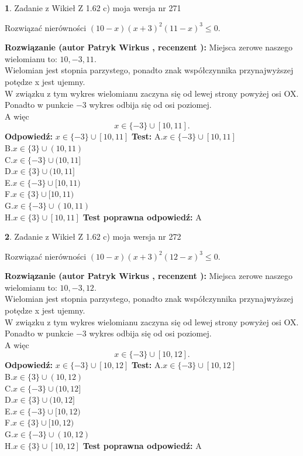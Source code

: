 \documentclass[12pt, a4paper]{article}
\theoremstyle{definition} %
\newtheorem{zad}{}
\newcommand{\zadStart}[1]{\begin{zad}#1\newline}
\newcommand{\zadStop}{\end{zad}}
\newcommand{\rozwStart}[2]{\noindent \textbf{Rozwiązanie (autor #1 , recenzent #2): }\newline}
\newcommand{\rozwStop}{\newline}
\newcommand{\odpStart}{\noindent \textbf{Odpowiedź:}\newline}
\newcommand{\odpStop}{\newline}
\newcommand{\testStart}{\noindent \textbf{Test:}\newline}
\newcommand{\testStop}{\newline}
\newcommand{\kluczStart}{\noindent \textbf{Test poprawna odpowiedź:}\newline}
\newcommand{\kluczStop}{\newline}
\begin{document}
\zadStart{Zadanie z Wikieł Z 1.62 c) moja wersja nr 271}

Rozwiązać nierówności $(10-x)(x+3)^{2}(11-x)^{3}\le0$.
\zadStop
\rozwStart{Patryk Wirkus}{}
Miejsca zerowe naszego wielomianu to: $10, -3, 11$.\\
Wielomian jest stopnia parzystego, ponadto znak współczynnika przy\linebreak najwyższej potędze x jest ujemny.\\ W związku z tym wykres wielomianu zaczyna się od lewej strony powyżej osi OX.\\
Ponadto w punkcie $-3$ wykres odbija się od osi poziomej.\\
A więc $$x \in \{-3\} \cup [10,11].$$
\rozwStop
\odpStart
$x \in \{-3\} \cup [10,11]$
\odpStop
\testStart
A.$x \in \{-3\} \cup [10,11]$\\
B.$x \in \{3\} \cup (10,11)$\\
C.$x \in \{-3\} \cup (10,11]$\\
D.$x \in \{3\} \cup (10,11]$\\
E.$x \in \{-3\} \cup [10,11)$\\
F.$x \in \{3\} \cup [10,11)$\\
G.$x \in \{-3\} \cup (10,11)$\\
H.$x \in \{3\} \cup [10,11]$
\testStop
\kluczStart
A
\kluczStop



\zadStart{Zadanie z Wikieł Z 1.62 c) moja wersja nr 272}

Rozwiązać nierówności $(10-x)(x+3)^{2}(12-x)^{3}\le0$.
\zadStop
\rozwStart{Patryk Wirkus}{}
Miejsca zerowe naszego wielomianu to: $10, -3, 12$.\\
Wielomian jest stopnia parzystego, ponadto znak współczynnika przy\linebreak najwyższej potędze x jest ujemny.\\ W związku z tym wykres wielomianu zaczyna się od lewej strony powyżej osi OX.\\
Ponadto w punkcie $-3$ wykres odbija się od osi poziomej.\\
A więc $$x \in \{-3\} \cup [10,12].$$
\rozwStop
\odpStart
$x \in \{-3\} \cup [10,12]$
\odpStop
\testStart
A.$x \in \{-3\} \cup [10,12]$\\
B.$x \in \{3\} \cup (10,12)$\\
C.$x \in \{-3\} \cup (10,12]$\\
D.$x \in \{3\} \cup (10,12]$\\
E.$x \in \{-3\} \cup [10,12)$\\
F.$x \in \{3\} \cup [10,12)$\\
G.$x \in \{-3\} \cup (10,12)$\\
H.$x \in \{3\} \cup [10,12]$
\testStop
\kluczStart
A
\kluczStop
\end{document}
